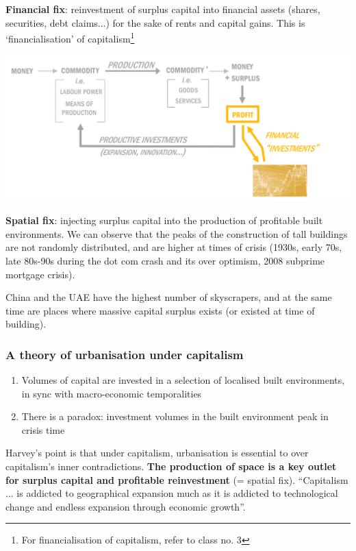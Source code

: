 \documentclass{article}
\begin{document}
\textbf{Financial fix}: reinvestment of surplus capital into financial assets (shares, securities, debt claims...) for the sake of rents and capital gains. This is `financialisation' of capitalism\footnote{For financialisation of capitalism, refer to class no. 3}

\includegraphics[width=\textwidth]{financial_fix}

\textbf{Spatial fix}: injecting surplus capital into the production of profitable built environments. We can observe that the peaks of the construction of tall buildings are not randomly distributed, and are higher at times of crisis (1930s, early 70s, late 80s-90s during the dot com crash and its over optimism, 2008 subprime mortgage crisis).

China and the UAE have the highest number of skyscrapers, and at the same time are places where massive capital surplus exists (or existed at time of building).

\subsubsection{A theory of urbanisation under capitalism}

\begin{enumerate}
	\item Volumes of capital are invested in a selection of localised built environments, in sync with macro-economic temporalities
	\item There is a paradox: investment volumes in the built environment peak in crisis time
\end{enumerate}

Harvey's point is that under capitalism, urbanisation is essential to over capitalism's inner contradictions. \textbf{The production of space is a key outlet for surplus capital and profitable reinvestment} (= spatial fix). ``Capitalism ... is addicted to geographical expansion much as it is addicted to technological change and endless expansion through economic growth''.
\end{document}
